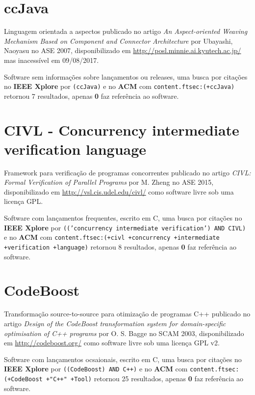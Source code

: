 \section{ccJava}

Linguagem orientada a aspectos
publicado no artigo {\it An Aspect-oriented Weaving Mechanism Based on Component and Connector Architecture}
por Ubayashi, Naoyasu
no ASE 2007,
disponibilizado em \url{http://posl.minnie.ai.kyutech.ac.jp/}
mas inacessível em 09/08/2017.

Software sem informações sobre lançamentos ou releases,
uma busca por citações no {\bf IEEE Xplore} por
\texttt{(ccJava)}
e no {\bf ACM} com
\texttt{content.ftsec:(+ccJava)}
retornou
7 resultados, apenas
{\bf 0} faz referência ao software.



\section{CIVL - Concurrency intermediate verification language}

Framework para verificação de programas concorrentes
publicado no artigo {\it CIVL: Formal Verification of Parallel Programs}
por M. Zheng
no ASE 2015,
disponibilizado em \url{http://vsl.cis.udel.edu/civl/}
como software livre
sob uma licença GPL.

Software com lançamentos frequentes,
escrito em C,
uma busca por citações no {\bf IEEE Xplore} por
\texttt{(('concurrency intermediate verification') AND CIVL)}
e no {\bf ACM} com
\texttt{content.ftsec:(+civl +concurrency +intermediate +verification +language)}
retornou
8 resultados, apenas
{\bf 0} faz referência ao software.



\section{CodeBoost}

Transformação source-to-source para otimização de programas C++
publicado no artigo {\it Design of the CodeBoost transformation system for domain-specific optimisation of C++ programs}
por O. S. Bagge
no SCAM 2003,
disponibilizado em \url{http://codeboost.org/}
como software livre
sob uma licença GPL v2.

Software com lançamentos ocsaionais,
escrito em C,
uma busca por citações no {\bf IEEE Xplore} por
\texttt{((CodeBoost) AND C++)}
e no {\bf ACM} com
\texttt{content.ftsec:(+CodeBoost +"C++" +Tool)}
retornou
25 resultados, apenas
{\bf 0} faz referência ao software.



